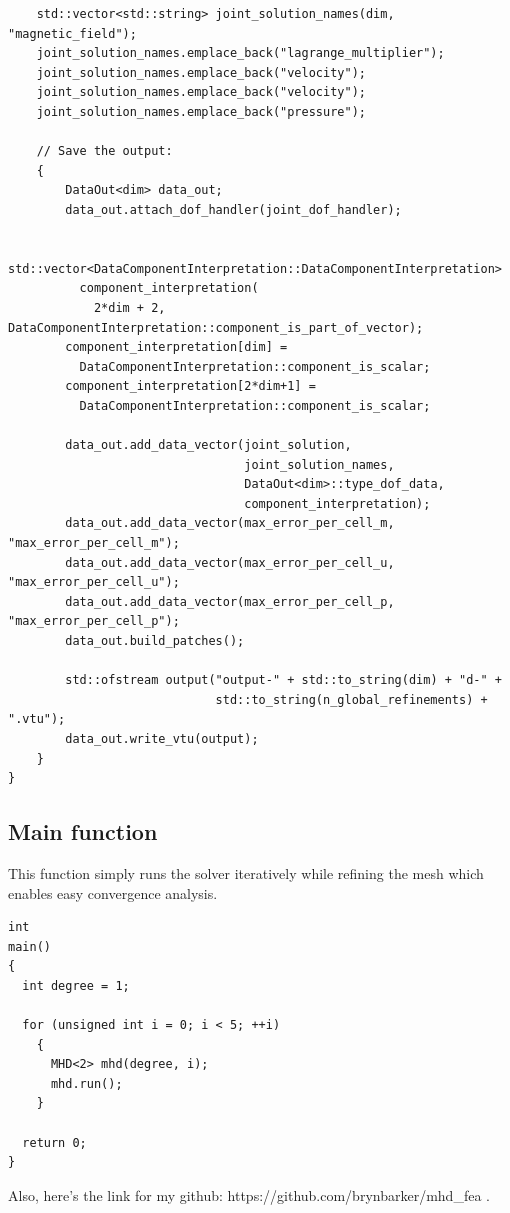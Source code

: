 \documentclass{article}
\begin{document}
\begin{lstlisting}
    std::vector<std::string> joint_solution_names(dim, "magnetic_field");
    joint_solution_names.emplace_back("lagrange_multiplier");
    joint_solution_names.emplace_back("velocity");
    joint_solution_names.emplace_back("velocity");
    joint_solution_names.emplace_back("pressure");

    // Save the output:
    {
        DataOut<dim> data_out;
        data_out.attach_dof_handler(joint_dof_handler);

        std::vector<DataComponentInterpretation::DataComponentInterpretation>
          component_interpretation(
            2*dim + 2, DataComponentInterpretation::component_is_part_of_vector);
        component_interpretation[dim] =
          DataComponentInterpretation::component_is_scalar;
        component_interpretation[2*dim+1] =
          DataComponentInterpretation::component_is_scalar;

        data_out.add_data_vector(joint_solution,
                                 joint_solution_names,
                                 DataOut<dim>::type_dof_data,
                                 component_interpretation);
        data_out.add_data_vector(max_error_per_cell_m, "max_error_per_cell_m");
        data_out.add_data_vector(max_error_per_cell_u, "max_error_per_cell_u");
        data_out.add_data_vector(max_error_per_cell_p, "max_error_per_cell_p");
        data_out.build_patches();

        std::ofstream output("output-" + std::to_string(dim) + "d-" +
                             std::to_string(n_global_refinements) + ".vtu");
        data_out.write_vtu(output);
    }
}
\end{lstlisting}
\subsection*{Main function}
This function simply runs the solver iteratively while refining the mesh which enables easy convergence analysis.
\begin{lstlisting}
int
main()
{
  int degree = 1;

  for (unsigned int i = 0; i < 5; ++i)
    {
      MHD<2> mhd(degree, i);
      mhd.run();
    }

  return 0;
}
\end{lstlisting}
\noindent Also, here's the link for my github: https://github.com/brynbarker/mhd\_fea .



\end{document}
